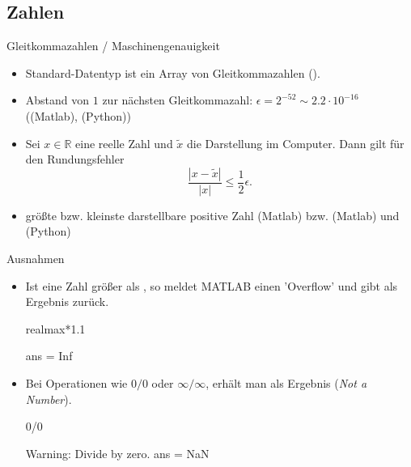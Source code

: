 \documentclass[hyperref={xetex}]{beamer}
\begin{document}
\subsection{Zahlen}
%
%
\begin{frame}[fragile]{Gleitkommazahlen / Maschinengenauigkeit}
\begin{itemize}
\item Standard-Datentyp ist ein Array von Gleitkommazahlen ().
\item Abstand von $1$ zur nächsten Gleitkommazahl: $\epsilon
  = 2^{-52} \sim 2.2\cdot10^{-16}$ ((Matlab), (Python))
\item Sei $x \in \mathbb{R}$ eine reelle Zahl und $\tilde x$ die
  Darstellung im Computer. Dann gilt für den Rundungsfehler \\[-0.5cm]
\[ \frac{|x - \tilde x|}{|x|}\leq \frac{1}{2} \epsilon .\]
\item größte bzw. kleinste darstellbare positive Zahl
(Matlab) bzw. (Matlab) und (Python)
\end{itemize}
\end{frame}
%
%
\begin{frame}[fragile]{Ausnahmen}
\begin{itemize}
\item Ist eine Zahl größer als , so meldet MATLAB einen
  'Overflow' und gibt als Ergebnis  zurück.
\begin{matlabin}
realmax*1.1
\end{matlabin}
\begin{matlab}
 ans =   Inf
\end{matlab}

\item Bei Operationen wie $0/0$  oder $\infty / \infty$, erhält man als Ergebnis
   ({\it Not a Number}).
\begin{matlabin}
0/0 
\end{matlabin}
\begin{matlab}
Warning: Divide by zero.
ans =   NaN 
\end{matlab}

\end{itemize}
\end{frame}
%
%
\end{document}
